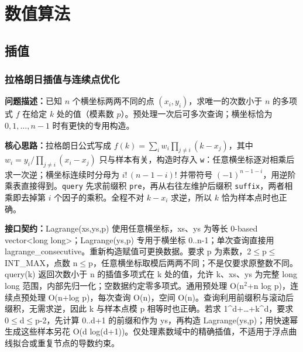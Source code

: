 \Needspace{180pt}

\chapter{数值算法}

\section{插值}

\subsection{拉格朗日插值与连续点优化}\label{compact-Lagrange}

\noindent\textbf{问题描述：}\allowbreak 已知 $n$ 个横坐标两两不同的点 $(x_i,y_i)$，求唯一的次数小于 $n$ 的多项式 $f$ 在给定 $k$ 处的值（模素数 $p$）。预处理一次后可多次查询；横坐标恰为 $0,1,\dots,n-1$ 时有更快的专用构造。

\textbf{核心思路：}\allowbreak 拉格朗日公式写成 $f(k)=\sum_i w_i\prod_{j\ne i}(k-x_j)$，其中 $w_i=y_i/\prod_{j\ne i}(x_i-x_j)$ 只与样本有关，构造时存入 \texttt{w}：任意横坐标逐对相乘后求一次逆；横坐标连续时分母为 $i!\,(n-1-i)!$ 并带符号 $(-1)^{n-1-i}$，用逆阶乘表直接得到。\texttt{query} 先求前缀积 \texttt{pre}，再从右往左维护后缀积 \texttt{suffix}，两者相乘即去掉第 $i$ 个因子的乘积。全程不对 $k-x_i$ 求逆，所以 $k$ 恰为样本点时也正确。



{\sloppy{}\noindent\textbf{接口契约：}Lagrange(xs,ys,p) 使用任意横坐标，xs、ys 为等长 0-based vector<long long>；Lagrange(ys,p) 专用于横坐标 0..n-1；单次查询直接用 lagrange\_consecutive。重新构造赋值可更换数据。要求 p 为素数，2$\le$p$\le$INT\_MAX，点数 n$\le$p，任意横坐标取模后两两不同；不是仅要求原整数不同。query(k) 返回次数小于 n 的插值多项式在 k 处的值，允许 k、xs、ys 为完整 long long 范围，内部先归一化；空数据约定零多项式。通用预处理 O(n$^{2}$+n log p)，连续点预处理 O(n+log p)，每次查询 O(n)，空间 O(n)。查询利用前缀积与滚动后缀积，无需求逆，因此 k 与样本点模 p 相等时也正确。若求 1\textasciicircum{}d+…+k\textasciicircum{}d，要求 0$\le$d$\le$p-2，先计算 0..d+1 的前缀和作为 ys，再构造 Lagrange(ys,p)；用快速幂生成这些样本另花 O(d log(d+1))。仅处理素数域中的精确插值，不适用于浮点曲线拟合或重复节点的导数约束。\par}



\Needspace{293pt}

